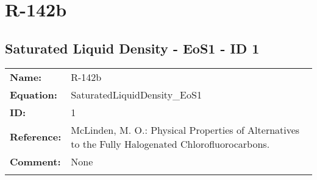 \section{R-142b}
%
\subsection{Saturated Liquid Density - EoS1 - ID 1}
%
\begin{tabular}[l]{|lp{11.5cm}|}
\hline
\addlinespace

\textbf{Name:} & R-142b \\
\textbf{Equation:} & SaturatedLiquidDensity\_EoS1 \\
\textbf{ID:} & 1 \\
\textbf{Reference:} & McLinden, M. O.: Physical Properties of Alternatives to the Fully Halogenated Chlorofluorocarbons. \\
\textbf{Comment:} & None \\

\addlinespace
\hline
\end{tabular}
\newline

